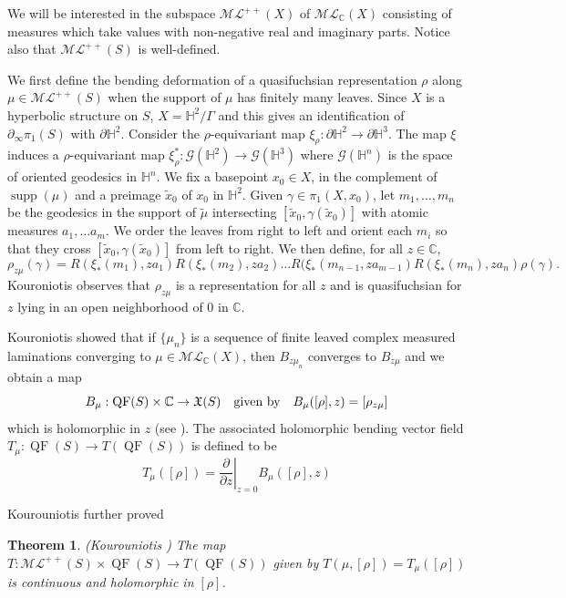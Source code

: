 \documentclass{amsart}
\theoremstyle{plain}
\newtheorem{theorem}[proposition]{Theorem}
\theoremstyle{definition}
\theoremstyle{remark}
\newcommand{\CC}{\mathbb C}
\newcommand{\Hp}{{\mathbb H}^2}
\newcommand{\QF}{\operatorname{QF}}
\newcommand{\supp}{{\operatorname{supp}}}
\newcommand{\C}{\mathbb C}
\newcommand{\<}{\left <}
\renewcommand{\>}{\right >}
\renewcommand{\C}{\mathbb C}
\begin{document}
We will be interested in the subspace $\mathcal{ML}^{++}(X)$ of $\mathcal{ML}_\CC(X)$ consisting of measures
which take values with non-negative real and imaginary parts. 
Notice also that $\mathcal{ML}^{++}(S)$ is well-defined.


We first define the bending deformation of a quasifuchsian representation $\rho$ along $\mu\in \mathcal{ML}^{++}(S)$ when the support of $\mu$ has finitely many leaves.
Since $X$ is a hyperbolic structure on $S$, $X=\mathbb H^2/\Gamma$ and this gives an identification of
$\partial_\infty\pi_1(S)$ with $\partial\mathbb H^2$. Consider the $\rho$-equivariant map $\xi_\rho:\partial \mathbb H^2\to\partial\mathbb H^3$.
The map $\xi$ induces a $\rho$-equivariant map $\xi_\rho^*:\mathcal G(\Hp)\to\mathcal G(\mathbb H^3)$ where $\mathcal G(\mathbb H^n)$ is the
space of oriented geodesics in $\mathbb H^n$. We fix a basepoint $x_0\in X$, in the complement of $\supp(\mu)$ and a preimage 
$\tilde x_0$ of $x_0$ in $\mathbb H^2$.
Given $\gamma\in \pi_1(X,x_0)$, 
let $m_1,\ldots, m_n$ be the geodesics in the support of $\tilde \mu$ intersecting $ [\tilde x_0, \gamma(\tilde x_0)]$ with  
atomic measures $a_1,\ldots a_m$.  We order the leaves from right to left and orient each $m_i$ so that they cross
$ [\tilde x_0, \gamma(\tilde x_0)]$ from left to right.
We then define, for all $z\in\mathbb C$,
$$\rho_{z\mu}(\gamma) =  R(\xi_*(m_1),za_1)R(\xi_*(m_2),za_2)\ldots R(\xi_*(m_{n-1},za_{m-1})R(\xi_*(m_n),za_n)\rho(\gamma).$$
Kouroniotis observes that $\rho_{z\mu}$ is a representation for all $z$ and is quasifuchsian  for $z$ lying in
an open neighborhood of $0$ in $\C$. 

Kouroniotis showed that if $\{\mu_n\}$ is a sequence of finite leaved complex measured laminations converging to $\mu\in \mathcal{ML}_\CC(X)$,
then $B_{z\mu_n}$ converges to $B_{z\mu}$ and we obtain a map
$$B_\mu: \QF(S)\times \CC\to \frak X(S)\ \ 
\text{ given by }\ \ 
B_\mu([\rho],z) = [\rho_{z\mu}]$$
which is holomorphic in $z$ (see \cite{kouron-cont}). 
The associated holomorphic bending vector field $T_\mu: \QF(S) \rightarrow T(\QF(S))$ is defined to be
$$T_\mu([\rho]) = \left.\frac{\partial }{\partial z}\right|_{z=0} B_\mu([\rho],z)$$
 
Kourouniotis further proved

\begin{theorem}{\rm (Kourouniotis \cite[Theorem  3]{kouron-cont})}
\label{continuity of derivative}
 The map $T:\mathcal{ML}^{++}(S)\times \QF(S)\rightarrow T(\QF(S))$ given by $T(\mu,[\rho]) = T_\mu([\rho])$ is continuous and  holomorphic in $[\rho]$. 
\label{kourounitis-cont}
\end{theorem}
\end{document}
